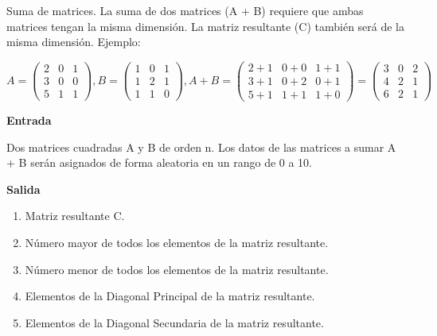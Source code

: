 
\question Suma de matrices. La suma de dos matrices (A + B) requiere que
          ambas matrices tengan la misma dimensión. La matriz resultante (C)
          también será de la misma dimensión. Ejemplo:

\begin{displaymath}
  A = 
  \begin{pmatrix}
    2 & 0 & 1 \\
    3 & 0 & 0 \\
    5 & 1 & 1
  \end{pmatrix},
  B=
  \begin{pmatrix}
    1 & 0 & 1 \\
    1 & 2 & 1 \\
    1 & 1 & 0
  \end{pmatrix},
  A + B =
  \begin{pmatrix}
    2+1 & 0+0 & 1+1 \\
    3+1 & 0+2 & 0+1 \\
    5+1 & 1+1 & 1+0
  \end{pmatrix}=
  \begin{pmatrix}
    3 & 0 & 2 \\
    4 & 2 & 1 \\
    6 & 2 & 1
  \end{pmatrix}
\end{displaymath}

\textbf{Entrada}

Dos matrices cuadradas A y B de orden n. Los datos de las matrices a sumar A
+ B serán asignados de forma aleatoria en un rango de 0 a 10.

\textbf{Salida}

\begin{enumerate}
  \item Matriz resultante C.
  \item Número mayor de todos los elementos de la matriz resultante.
  \item Número menor de todos los elementos de la matriz resultante.
  \item Elementos de la Diagonal Principal de la matriz resultante.
  \item Elementos de la Diagonal Secundaria de la matriz resultante.
\end{enumerate}
